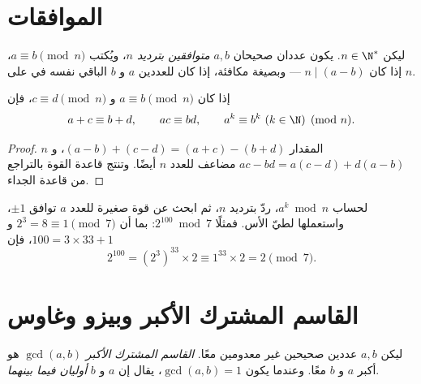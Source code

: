 \section{الموافقات}

\begin{definition}[الموافقة]\label{def:g12:arith:congruence}
ليكن $n \in \N^*$. يكون عددان صحيحان $a, b$ \emph{متوافقين بترديد
$n$}، ويُكتب $a \equiv b \pmod n$، إذا كان $n \mid (a - b)$
--- وبصيغة مكافئة، إذا كان للعددين $a$ و $b$ الباقي نفسه في  على $n$.
\end{definition}

\begin{proposition}\label{prop:g12:arith:congops}
إذا كان $a \equiv b \pmod n$ و $c \equiv d \pmod n$، فإن
\[
a + c \equiv b + d, \qquad
ac \equiv bd, \qquad
a^k \equiv b^k \ (k \in \N) \pmod n .
\]
\end{proposition}

\begin{proof}
 $n$ المقدار $(a-b) + (c-d) = (a+c) - (b+d)$، و
$ac - bd = a(c - d) + d(a - b)$ مضاعف للعدد $n$ أيضًا. وتنتج قاعدة القوة
بالتراجع من قاعدة الجداء.
\end{proof}

\begin{method}\label{met:g12:arith:powers}
لحساب $a^k \bmod n$، ردّ  بترديد $n$، ثم ابحث عن قوة صغيرة
للعدد $a$ توافق $\pm1$، واستعملها لطيّ الأس. فمثلًا
$2^{100} \bmod 7$: بما أن $2^3 = 8 \equiv 1 \pmod 7$ و
$100 = 3\times33 + 1$، فإن
\[
2^{100} = \left(2^{3}\right)^{33} \times 2 \equiv 1^{33}\times 2 = 2 \pmod 7 .
\]
\end{method}

\section{القاسم المشترك الأكبر وبيزو وغاوس}

\begin{definition}\label{def:g12:arith:gcd}
ليكن $a, b$ عددين صحيحين غير معدومين معًا. \emph{القاسم المشترك
الأكبر} $\gcd(a, b)$ هو أكبر   $a$
و $b$ معًا. وعندما يكون $\gcd(a,b) = 1$، يقال إن $a$ و $b$
\emph{أوليان فيما بينهما}.
\end{definition}

